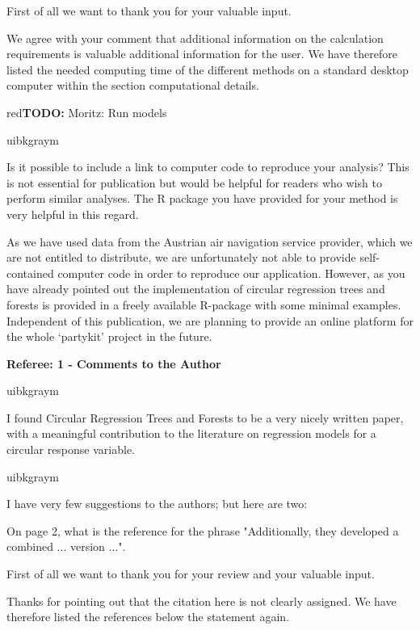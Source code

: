 \documentclass[english, noconfig]{uibklttr}
\newcommand{\section}[1]{{\Large{\textbf{#1}}}}
\newenvironment{re}{
    \begin{color}{uibkgraym}
        \itshape
}{
    \end{color}
}
\newcommand{\todo}[1]{
    \begin{color}{red}\textbf{TODO:} #1\end{color}%
}
\begin{document}
First of all we want to thank you for your valuable input. 

We agree with your comment that additional information on the calculation
requirements is valuable additional information for the user.  We have
therefore listed the needed computing time of the different methods on a
standard desktop computer within the section computational details.
\todo{Moritz: Run models}

\vspace{0.5em}
\begin{re}
Is it possible to include a link to computer code to reproduce your
analysis? This is not essential for publication but would be helpful for
readers who wish to perform similar analyses. The R package you have provided
for your method is very helpful in this regard.  
\end{re}

As we have used data from the Austrian air navigation service provider, which
we are not entitled to distribute, we are unfortunately not able to provide
self-contained computer code in order to reproduce our application. However, as you have already
pointed out the implementation of circular regression trees and forests is
provided in a freely available R-package with some minimal examples.
Independent of this publication, we are planning to provide an online
platform for the whole `partykit' project in the future.

\newpage

\section{Referee: 1 - Comments to the Author}

\begin{re}
I found Circular Regression Trees and Forests to be a very nicely written
paper, with a meaningful contribution to the literature on regression models
for a circular response variable. 
\end{re}

\begin{re}
I have very few suggestions to the authors; but here are two:

On page 2, what is the reference for the phrase "Additionally, they
developed a combined ... version ...".
\end{re}

First of all we want to thank you for your review and your valuable input. 

Thanks for pointing out that the citation here is not clearly assigned. We have therefore
listed the references below the statement again.
\end{document}
